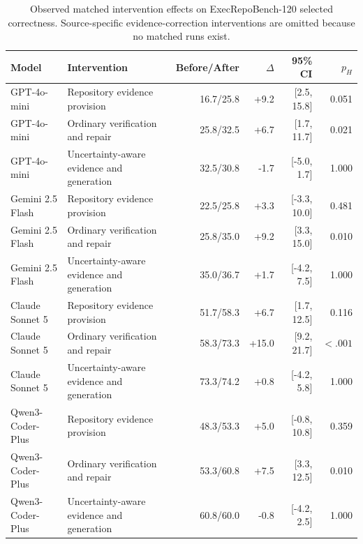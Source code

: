 \begin{table}[t]
\centering
\small
\caption{Observed matched intervention effects on ExecRepoBench-120 selected correctness. Source-specific evidence-correction interventions are omitted because no matched runs exist.}
\label{tab:interventions_final}
\begin{tabular}{llrrrr}
\toprule
Model & Intervention & Before/After & $\Delta$ & 95\% CI & $p_H$ \\
\midrule
GPT-4o-mini & Repository evidence provision & 16.7/25.8 & +9.2 & [2.5, 15.8] & 0.051 \\
GPT-4o-mini & Ordinary verification and repair & 25.8/32.5 & +6.7 & [1.7, 11.7] & 0.021 \\
GPT-4o-mini & Uncertainty-aware evidence and generation & 32.5/30.8 & -1.7 & [-5.0, 1.7] & 1.000 \\
Gemini 2.5 Flash & Repository evidence provision & 22.5/25.8 & +3.3 & [-3.3, 10.0] & 0.481 \\
Gemini 2.5 Flash & Ordinary verification and repair & 25.8/35.0 & +9.2 & [3.3, 15.0] & 0.010 \\
Gemini 2.5 Flash & Uncertainty-aware evidence and generation & 35.0/36.7 & +1.7 & [-4.2, 7.5] & 1.000 \\
Claude Sonnet 5 & Repository evidence provision & 51.7/58.3 & +6.7 & [1.7, 12.5] & 0.116 \\
Claude Sonnet 5 & Ordinary verification and repair & 58.3/73.3 & +15.0 & [9.2, 21.7] & $<.001$ \\
Claude Sonnet 5 & Uncertainty-aware evidence and generation & 73.3/74.2 & +0.8 & [-4.2, 5.8] & 1.000 \\
Qwen3-Coder-Plus & Repository evidence provision & 48.3/53.3 & +5.0 & [-0.8, 10.8] & 0.359 \\
Qwen3-Coder-Plus & Ordinary verification and repair & 53.3/60.8 & +7.5 & [3.3, 12.5] & 0.010 \\
Qwen3-Coder-Plus & Uncertainty-aware evidence and generation & 60.8/60.0 & -0.8 & [-4.2, 2.5] & 1.000 \\
\bottomrule
\end{tabular}
\end{table}
